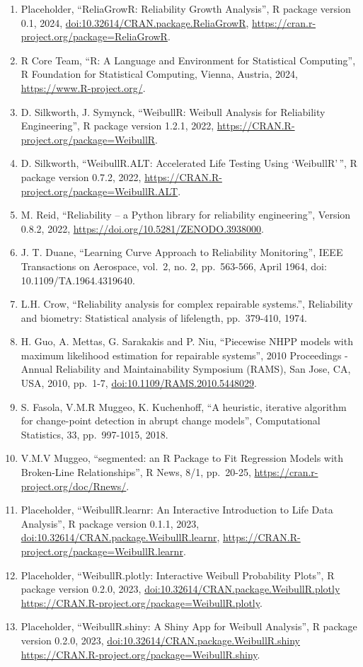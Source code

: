 \documentclass[
]{article}
\begin{document}
\begin{enumerate}
\def\labelenumi{\arabic{enumi}.}
\item
  Placeholder, ``ReliaGrowR: Reliability Growth Analysis'', R package
  version 0.1, 2024, \url{doi:10.32614/CRAN.package.ReliaGrowR},
  \url{https://cran.r-project.org/package=ReliaGrowR}.
\item
  R Core Team, ``R: A Language and Environment for Statistical
  Computing'', R Foundation for Statistical Computing, Vienna, Austria,
  2024, \url{https://www.R-project.org/}.
\item
  D. Silkworth, J. Symynck, ``WeibullR: Weibull Analysis for Reliability
  Engineering'', R package version 1.2.1, 2022,
  \url{https://CRAN.R-project.org/package=WeibullR}.
\item
  D. Silkworth, ``WeibullR.ALT: Accelerated Life Testing Using
  `WeibullR'\,'', R package version 0.7.2, 2022,
  \url{https://CRAN.R-project.org/package=WeibullR.ALT}.
\item
  M. Reid, ``Reliability -- a Python library for reliability
  engineering'', Version 0.8.2, 2022,
  \url{https://doi.org/10.5281/ZENODO.3938000}.
\item
  J. T. Duane, ``Learning Curve Approach to Reliability Monitoring'',
  IEEE Transactions on Aerospace, vol.~2, no. 2, pp.~563-566, April
  1964, doi: 10.1109/TA.1964.4319640.
\item
  L.H. Crow, ``Reliability analysis for complex repairable systems.'',
  Reliability and biometry: Statistical analysis of lifelength,
  pp.~379-410, 1974.
\item
  H. Guo, A. Mettas, G. Sarakakis and P. Niu, ``Piecewise NHPP models
  with maximum likelihood estimation for repairable systems'', 2010
  Proceedings - Annual Reliability and Maintainability Symposium (RAMS),
  San Jose, CA, USA, 2010, pp.~1-7, \url{doi:10.1109/RAMS.2010.5448029}.
\item
  S. Fasola, V.M.R Muggeo, K. Kuchenhoff, ``A heuristic, iterative
  algorithm for change-point detection in abrupt change models'',
  Computational Statistics, 33, pp.~997-1015, 2018.
\item
  V.M.V Muggeo, ``segmented: an R Package to Fit Regression Models with
  Broken-Line Relationships'', R News, 8/1, pp.~20-25,
  \url{https://cran.r-project.org/doc/Rnews/}.
\item
  Placeholder, ``WeibullR.learnr: An Interactive Introduction to Life
  Data Analysis'', R package version 0.1.1, 2023,
  \url{doi:10.32614/CRAN.package.WeibullR.learnr},
  \url{https://CRAN.R-project.org/package=WeibullR.learnr}.
\item
  Placeholder, ``WeibullR.plotly: Interactive Weibull Probability
  Plots'', R package version 0.2.0, 2023,
  \url{doi:10.32614/CRAN.package.WeibullR.plotly}
  \url{https://CRAN.R-project.org/package=WeibullR.plotly}.
\item
  Placeholder, ``WeibullR.shiny: A Shiny App for Weibull Analysis'', R
  package version 0.2.0, 2023,
  \url{doi:10.32614/CRAN.package.WeibullR.shiny}
  \url{https://CRAN.R-project.org/package=WeibullR.shiny}.
\end{enumerate}
\end{document}
